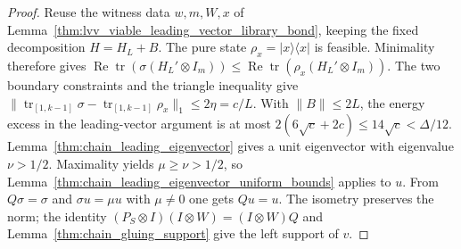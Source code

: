 \begin{proof}\leanok
    Reuse the witness data $w,m,W,x$ of
    Lemma~\ref{thm:lvv_viable_leading_vector_library_bond}, keeping the fixed
    decomposition $H=H_L+B$.
    The pure state $\rho_x=|x\rangle\langle x|$ is feasible.
    Minimality therefore gives
    $\operatorname{Re}\operatorname{tr}(\sigma(H_L'\otimes I_m))
        \le\operatorname{Re}\operatorname{tr}(\rho_x(H_L'\otimes I_m))$.
    The two boundary constraints and the triangle inequality give
    $\|\operatorname{tr}_{[1,k-1]}\sigma-
        \operatorname{tr}_{[1,k-1]}\rho_x\|_1\le2\eta=c/L$.
    With $\|B\|\le2L$, the energy excess in the leading-vector argument
    is at most $2(6\sqrt c+2c)\le14\sqrt c<\Delta/12$.
    Lemma~\ref{thm:chain_leading_eigenvector} gives a unit eigenvector
    with eigenvalue $\nu>1/2$. Maximality yields $\mu\ge\nu>1/2$,
    so Lemma~\ref{thm:chain_leading_eigenvector_uniform_bounds} applies to $u$.
    From $Q\sigma=\sigma$ and $\sigma u=\mu u$ with $\mu\ne0$ one gets $Qu=u$.
    The isometry preserves the norm; the identity
    $(P_S\otimes I)(I\otimes W)=(I\otimes W)Q$ and
    Lemma~\ref{thm:chain_gluing_support} give the left support of $v$.
\end{proof}
